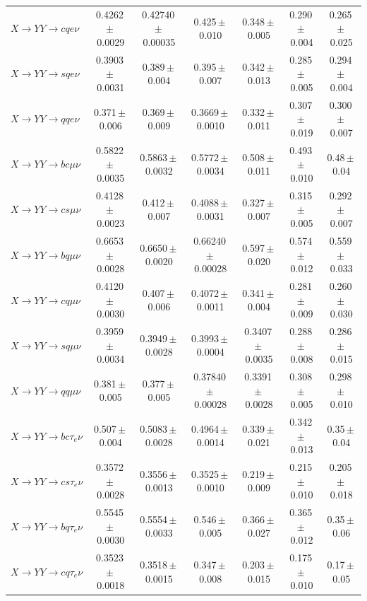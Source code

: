 \begin{landscape}
{\begin{longtable}{@{\extracolsep{\fill}}lcccccc@{}}
$X\to YY\to cqe\nu$ & 0.4262\,$\pm$\,0.0029 & 0.42740\,$\pm$\,0.00035 & 0.425\,$\pm$\,0.010 & 0.348\,$\pm$\,0.005 & 0.290\,$\pm$\,0.004 & 0.265\,$\pm$\,0.025 \\
$X\to YY\to sqe\nu$ & 0.3903\,$\pm$\,0.0031 & 0.389\,$\pm$\,0.004 & 0.395\,$\pm$\,0.007 & 0.342\,$\pm$\,0.013 & 0.285\,$\pm$\,0.005 & 0.294\,$\pm$\,0.004 \\
$X\to YY\to qqe\nu$ & 0.371\,$\pm$\,0.006 & 0.369\,$\pm$\,0.009 & 0.3669\,$\pm$\,0.0010 & 0.332\,$\pm$\,0.011 & 0.307\,$\pm$\,0.019 & 0.300\,$\pm$\,0.007 \\
$X\to YY\to bc\mu\nu$ & 0.5822\,$\pm$\,0.0035 & 0.5863\,$\pm$\,0.0032 & 0.5772\,$\pm$\,0.0034 & 0.508\,$\pm$\,0.011 & 0.493\,$\pm$\,0.010 & 0.48\,$\pm$\,0.04 \\
$X\to YY\to cs\mu\nu$ & 0.4128\,$\pm$\,0.0023 & 0.412\,$\pm$\,0.007 & 0.4088\,$\pm$\,0.0031 & 0.327\,$\pm$\,0.007 & 0.315\,$\pm$\,0.005 & 0.292\,$\pm$\,0.007 \\
$X\to YY\to bq\mu\nu$ & 0.6653\,$\pm$\,0.0028 & 0.6650\,$\pm$\,0.0020 & 0.66240\,$\pm$\,0.00028 & 0.597\,$\pm$\,0.020 & 0.574\,$\pm$\,0.012 & 0.559\,$\pm$\,0.033 \\
$X\to YY\to cq\mu\nu$ & 0.4120\,$\pm$\,0.0030 & 0.407\,$\pm$\,0.006 & 0.4072\,$\pm$\,0.0011 & 0.341\,$\pm$\,0.004 & 0.281\,$\pm$\,0.009 & 0.260\,$\pm$\,0.030 \\
$X\to YY\to sq\mu\nu$ & 0.3959\,$\pm$\,0.0034 & 0.3949\,$\pm$\,0.0028 & 0.3993\,$\pm$\,0.0004 & 0.3407\,$\pm$\,0.0035 & 0.288\,$\pm$\,0.008 & 0.286\,$\pm$\,0.015 \\
$X\to YY\to qq\mu\nu$ & 0.381\,$\pm$\,0.005 & 0.377\,$\pm$\,0.005 & 0.37840\,$\pm$\,0.00028 & 0.3391\,$\pm$\,0.0028 & 0.308\,$\pm$\,0.005 & 0.298\,$\pm$\,0.010 \\
\midrule
$X\to YY\to bc\tau_e\nu$ & 0.507\,$\pm$\,0.004 & 0.5083\,$\pm$\,0.0028 & 0.4964\,$\pm$\,0.0014 & 0.339\,$\pm$\,0.021 & 0.342\,$\pm$\,0.013 & 0.35\,$\pm$\,0.04 \\
$X\to YY\to cs\tau_e\nu$ & 0.3572\,$\pm$\,0.0028 & 0.3556\,$\pm$\,0.0013 & 0.3525\,$\pm$\,0.0010 & 0.219\,$\pm$\,0.009 & 0.215\,$\pm$\,0.010 & 0.205\,$\pm$\,0.018 \\
$X\to YY\to bq\tau_e\nu$ & 0.5545\,$\pm$\,0.0030 & 0.5554\,$\pm$\,0.0033 & 0.546\,$\pm$\,0.005 & 0.366\,$\pm$\,0.027 & 0.365\,$\pm$\,0.012 & 0.35\,$\pm$\,0.06 \\
$X\to YY\to cq\tau_e\nu$ & 0.3523\,$\pm$\,0.0018 & 0.3518\,$\pm$\,0.0015 & 0.347\,$\pm$\,0.008 & 0.203\,$\pm$\,0.015 & 0.175\,$\pm$\,0.010 & 0.17\,$\pm$\,0.05 \\

\end{longtable}}
\end{landscape}
